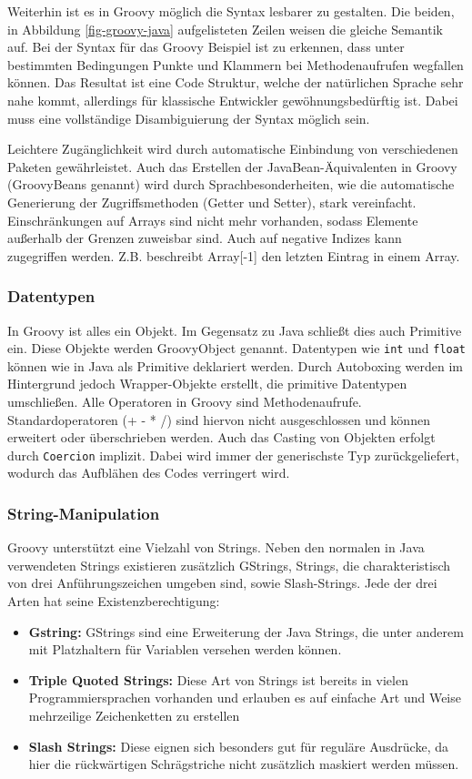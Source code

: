 Weiterhin ist es in Groovy möglich die Syntax lesbarer zu gestalten.
Die beiden, in Abbildung \ref{fig-groovy-java} aufgelisteten Zeilen weisen die gleiche Semantik auf.
Bei der Syntax für das Groovy Beispiel ist zu erkennen, dass unter bestimmten Bedingungen Punkte und Klammern bei Methodenaufrufen wegfallen können. Das Resultat ist eine Code Struktur, welche der natürlichen Sprache sehr nahe kommt, allerdings für klassische Entwickler gewöhnungsbedürftig ist. Dabei muss eine vollständige Disambiguierung der Syntax möglich sein.

Leichtere Zugänglichkeit wird durch automatische Einbindung von verschiedenen Paketen gewährleistet.
Auch das Erstellen der JavaBean-Äquivalenten in Groovy (GroovyBeans genannt) wird durch Sprachbesonderheiten, wie die automatische Generierung der Zugriffsmethoden (Getter und Setter), stark vereinfacht.
Einschränkungen auf Arrays sind nicht mehr vorhanden, sodass Elemente außerhalb der Grenzen zuweisbar sind. Auch auf negative Indizes kann zugegriffen werden. Z.B. beschreibt Array[-1] den letzten Eintrag in einem Array.


\subsubsection{Datentypen}
In Groovy ist alles ein Objekt. Im Gegensatz zu Java schließt dies auch Primitive ein. Diese Objekte werden GroovyObject genannt. Datentypen wie \texttt{int} und \texttt{float} können wie in Java als Primitive deklariert werden. 
Durch Autoboxing werden im Hintergrund jedoch Wrapper-Objekte erstellt, die primitive Datentypen umschließen.
Alle Operatoren in Groovy sind Methodenaufrufe. Standardoperatoren (+ - * /) sind hiervon nicht ausgeschlossen und können erweitert oder überschrieben werden. Auch das Casting von Objekten erfolgt durch \texttt{Coercion} implizit. Dabei wird immer der generischste Typ zurückgeliefert, wodurch das Aufblähen des Codes verringert wird.


\subsubsection{String-Manipulation}
Groovy unterstützt eine Vielzahl von Strings.
Neben den normalen in Java verwendeten Strings existieren zusätzlich GStrings, Strings, die charakteristisch von drei Anführungszeichen umgeben sind, sowie Slash-Strings. Jede der drei Arten hat seine Existenzberechtigung:

\begin{itemize}
	\item \textbf{Gstring:}
	GStrings sind eine Erweiterung der Java Strings, die unter anderem mit Platzhaltern für Variablen versehen werden können.
	\item \textbf{Triple Quoted Strings:}
	Diese Art von Strings ist bereits in vielen Programmiersprachen vorhanden und erlauben es auf einfache Art und Weise mehrzeilige Zeichenketten zu erstellen
	\item \textbf{Slash Strings:}
	Diese eignen sich besonders gut für reguläre Ausdrücke, da hier die rückwärtigen Schrägstriche nicht zusätzlich maskiert werden müssen.
\end{itemize}



